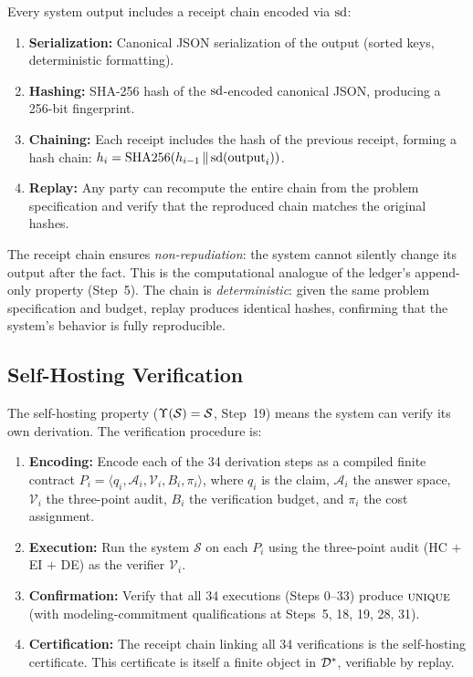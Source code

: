 Every system output includes a receipt chain encoded via $\mathrm{sd}$:
\begin{enumerate}[nosep]
  \item \textbf{Serialization:} Canonical JSON serialization of the
        output (sorted keys, deterministic formatting).
  \item \textbf{Hashing:} SHA-256 hash of the $\mathrm{sd}$-encoded canonical
        JSON, producing a 256-bit fingerprint.
  \item \textbf{Chaining:} Each receipt includes the hash of the previous
        receipt, forming a hash chain: $h_i = \mathrm{SHA256}(h_{i-1}
        \,\|\, \mathrm{sd}(\text{output}_i))$.
  \item \textbf{Replay:} Any party can recompute the entire chain from
        the problem specification and verify that the reproduced chain
        matches the original hashes.
\end{enumerate}

The receipt chain ensures \emph{non-repudiation}: the system cannot
silently change its output after the fact.  This is the computational
analogue of the ledger's append-only property (Step~5).  The chain is
\emph{deterministic}: given the same problem specification and budget,
replay produces identical hashes, confirming that the system's behavior
is fully reproducible.

\subsection{Self-Hosting Verification}

The self-hosting property ($\Upsilon(\mathcal{S}) = \mathcal{S}$, Step~19) means
the system can verify its own derivation.  The verification procedure
is:
\begin{enumerate}[nosep]
  \item \textbf{Encoding:} Encode each of the 34 derivation steps as a
        compiled finite contract $P_i = \langle q_i, \mathcal{A}_i,
        \mathcal{V}_i, B_i, \pi_i \rangle$, where $q_i$ is the claim,
        $\mathcal{A}_i$ the answer space, $\mathcal{V}_i$ the three-point
        audit, $B_i$ the verification budget, and $\pi_i$ the cost
        assignment.
  \item \textbf{Execution:} Run the system $\mathcal{S}$ on each $P_i$
        using the three-point audit (HC $+$ EI $+$ DE) as the verifier
        $\mathcal{V}_i$.
  \item \textbf{Confirmation:} Verify that all 34 executions (Steps
        0--33) produce $\textsc{unique}$ (with modeling-commitment qualifications
        at Steps~5, 18, 19, 28, 31).
  \item \textbf{Certification:} The receipt chain linking all 34
        verifications is the self-hosting certificate.  This certificate
        is itself a finite object in $\mathcal{D}^*$, verifiable by replay.
\end{enumerate}

